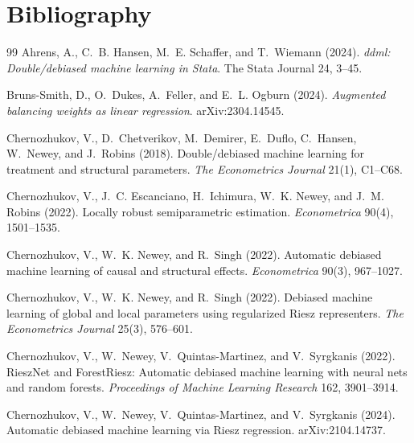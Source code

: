 \documentclass[11pt]{article}
\theoremstyle{definition}
\theoremstyle{plain}
\theoremstyle{remark}
\begin{document}
\section*{Bibliography}
\begin{thebibliography}{99}
Ahrens, A., C.~B. Hansen, M.~E. Schaffer, and T.~Wiemann (2024).
\newblock \textit{ddml: Double/debiased machine learning in Stata}.
\newblock The Stata Journal 24, 3--45.

Bruns-Smith, D., O.~Dukes, A.~Feller, and E.~L. Ogburn (2024).
\newblock \textit{Augmented balancing weights as linear regression}.
\newblock arXiv:2304.14545.

Chernozhukov, V., D.~Chetverikov, M.~Demirer, E.~Duflo, C.~Hansen,
W.~Newey, and J.~Robins (2018).
\newblock Double/debiased machine learning for treatment and structural parameters.
\newblock \textit{The Econometrics Journal} 21(1), C1--C68.

Chernozhukov, V., J.~C. Escanciano, H.~Ichimura, W.~K. Newey, and J.~M. Robins (2022).
\newblock Locally robust semiparametric estimation.
\newblock \textit{Econometrica} 90(4), 1501--1535.

Chernozhukov, V., W.~K. Newey, and R.~Singh (2022).
\newblock Automatic debiased machine learning of causal and structural effects.
\newblock \textit{Econometrica} 90(3), 967--1027.

Chernozhukov, V., W.~K. Newey, and R.~Singh (2022).
\newblock Debiased machine learning of global and local parameters using regularized Riesz representers.
\newblock \textit{The Econometrics Journal} 25(3), 576--601.

Chernozhukov, V., W.~Newey, V.~Quintas-Martinez, and V.~Syrgkanis (2022).
\newblock RieszNet and ForestRiesz: Automatic debiased machine learning with neural nets and random forests.
\newblock \textit{Proceedings of Machine Learning Research} 162, 3901--3914.

Chernozhukov, V., W.~Newey, V.~Quintas-Martinez, and V.~Syrgkanis (2024).
\newblock Automatic debiased machine learning via Riesz regression.
\newblock arXiv:2104.14737.


\end{thebibliography}
\end{document}
